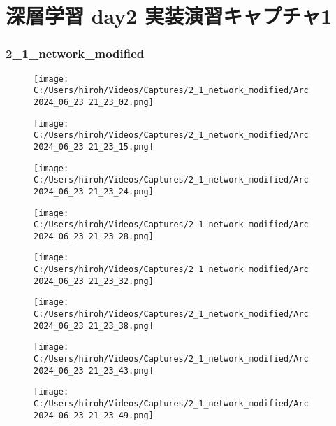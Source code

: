 \documentclass{ltjsarticle}
\begin{document}
\part*{深層学習 day2 実装演習キャプチャ1}

\section{2\_1\_network\_modified}
\begin{figure}[htbp]
  \centering
  \texttt{[image: C:/Users/hiroh/Videos/Captures/2\_1\_network\_modified/Arc 2024\_06\_23 21\_23\_02.png]}
\end{figure}
\begin{figure}[htbp]
  \centering
  \texttt{[image: C:/Users/hiroh/Videos/Captures/2\_1\_network\_modified/Arc 2024\_06\_23 21\_23\_15.png]}
\end{figure}
\begin{figure}[htbp]
  \centering
  \texttt{[image: C:/Users/hiroh/Videos/Captures/2\_1\_network\_modified/Arc 2024\_06\_23 21\_23\_24.png]}
\end{figure}
\begin{figure}[htbp]
  \centering
  \texttt{[image: C:/Users/hiroh/Videos/Captures/2\_1\_network\_modified/Arc 2024\_06\_23 21\_23\_28.png]}
\end{figure}
\begin{figure}[htbp]
  \centering
  \texttt{[image: C:/Users/hiroh/Videos/Captures/2\_1\_network\_modified/Arc 2024\_06\_23 21\_23\_32.png]}
\end{figure}
\begin{figure}[htbp]
  \centering
  \texttt{[image: C:/Users/hiroh/Videos/Captures/2\_1\_network\_modified/Arc 2024\_06\_23 21\_23\_38.png]}
\end{figure}
\begin{figure}[htbp]
  \centering
  \texttt{[image: C:/Users/hiroh/Videos/Captures/2\_1\_network\_modified/Arc 2024\_06\_23 21\_23\_43.png]}
\end{figure}
\begin{figure}[htbp]
  \centering
  \texttt{[image: C:/Users/hiroh/Videos/Captures/2\_1\_network\_modified/Arc 2024\_06\_23 21\_23\_49.png]}
\end{figure}

\clearpage
\end{document}
